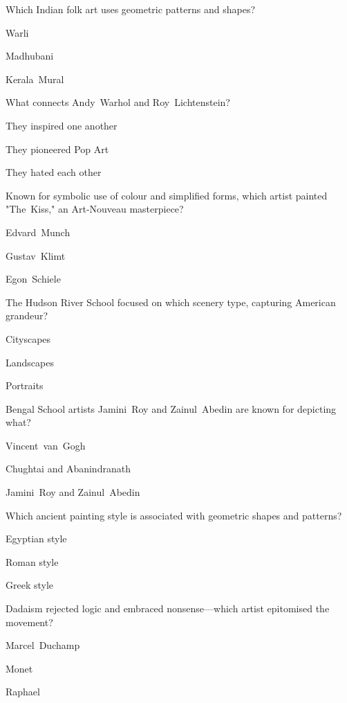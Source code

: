 \begin{enhancedmcq}{Which Indian folk art uses geometric patterns and shapes?}
\item Warli
\item Madhubani
\item Kerala Mural

\end{enhancedmcq}
\begin{enhancedmcq}{What connects Andy Warhol and Roy Lichtenstein?}
\item They inspired one another
\item They pioneered Pop Art
\item They hated each other

\end{enhancedmcq}
\begin{enhancedmcq}{Known for symbolic use of colour and simplified forms, which artist painted "The Kiss," an Art‑Nouveau masterpiece?}
\item Edvard Munch
\item Gustav Klimt
\item Egon Schiele

\end{enhancedmcq}
\begin{enhancedmcq}{The Hudson River School focused on which scenery type, capturing American grandeur?}
\item Cityscapes
\item Landscapes
\item Portraits

\end{enhancedmcq}
\begin{enhancedmcq}{Bengal School artists Jamini Roy and Zainul Abedin are known for depicting what?}
\item Vincent van Gogh
\item Chughtai and Abanindranath
\item Jamini Roy and Zainul Abedin

\end{enhancedmcq}
\begin{enhancedmcq}{Which ancient painting style is associated with geometric shapes and patterns?}
\item Egyptian style
\item Roman style
\item Greek style

\end{enhancedmcq}
\begin{enhancedmcq}{Dadaism rejected logic and embraced nonsense—which artist epitomised the movement?}
\item Marcel Duchamp
\item Monet
\item Raphael

\end{enhancedmcq}
